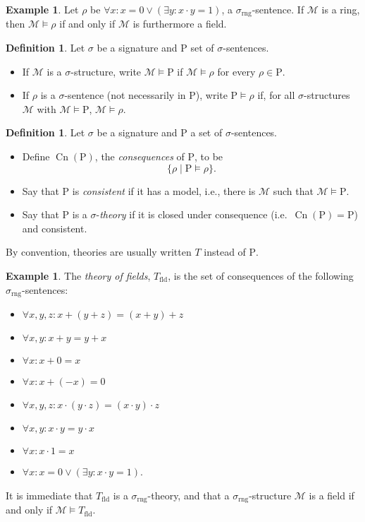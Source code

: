 \documentclass{article}
\theoremstyle{plain}
\theoremstyle{definition}
\newtheorem{defn}[thm]{Definition}
\newtheorem{example}[thm]{Example}
\newcommand{\defterm}{\emph}
\newcommand{\ringsig}{\sigma_{\operatorname{rng}}}
\newcommand{\fieldthy}{T_{\operatorname{fld}}}
\DeclareMathOperator{\Cn}{Cn}
\newcommand{\Rho}{\mathrm{P}}
\begin{document}
\begin{example}
  Let $\rho$ be $\forall x: x = 0 \vee (\exists y: x \cdot y = 1)$, a
  $\ringsig$-sentence. If $\mathcal{M}$ is a ring, then $\mathcal{M}
  \models \rho$ if and only if $\mathcal{M}$ is furthermore a field.
\end{example}

\begin{defn}
  Let $\sigma$ be a signature and $\Rho$ set of $\sigma$-sentences.
  \begin{itemize}
  \item If $\mathcal{M}$ is a $\sigma$-structure, write $\mathcal{M}
    \models \Rho$ if $\mathcal{M} \models \rho$ for every $\rho \in
    \Rho$.
  \item If $\mathcal{\rho}$ is a $\sigma$-sentence (not necessarily in
    $\Rho$), write $\Rho \models \rho$ if, for all $\sigma$-structures
    $\mathcal{M}$ with $\mathcal{M} \models \Rho$, $\mathcal{M}
    \models \rho$.
  \end{itemize}
\end{defn}

\begin{defn}
  Let $\sigma$ be a signature and $\Rho$ a set of $\sigma$-sentences.
  \begin{itemize}
  \item Define $\Cn(\Rho)$, the \defterm{consequences} of $\Rho$, to
    be $$\{\rho \mid \Rho \models \rho\}\text{.}$$
  \item Say that $\Rho$ is \defterm{consistent} if it has a model,
    i.e., there is $\mathcal{M}$ such that $\mathcal{M} \models \Rho$.
  \item Say that $\Rho$ is a $\sigma$-\defterm{theory} if it is closed
    under consequence (i.e.\ $\Cn(\Rho) = \Rho$) and consistent.
  \end{itemize}
\end{defn}

By convention, theories are usually written $T$ instead of $\Rho$.

\begin{example}\label{example:fieldthy}
  The \defterm{theory of fields}, $\fieldthy$, is the set of consequences of
  the following $\ringsig$-sentences:
  \begin{itemize}
  \item $\forall x,y,z: x + (y + z) = (x + y) + z$
  \item $\forall x,y: x + y = y + x$
  \item $\forall x: x + 0 = x$
  \item $\forall x: x + (-x) = 0$
  \item $\forall x,y,z: x \cdot (y \cdot z) = (x \cdot y) \cdot z$
  \item $\forall x,y: x \cdot y = y \cdot x$
  \item $\forall x: x \cdot 1 = x$
  \item $\forall x: x = 0 \vee (\exists y: x \cdot y = 1)$.
  \end{itemize}
  
  It is immediate that $\fieldthy$ is a $\ringsig$-theory, and that a
  $\ringsig$-structure $\mathcal{M}$ is a field if and only if
  $\mathcal{M} \models \fieldthy$.
\end{example}
\end{document}
